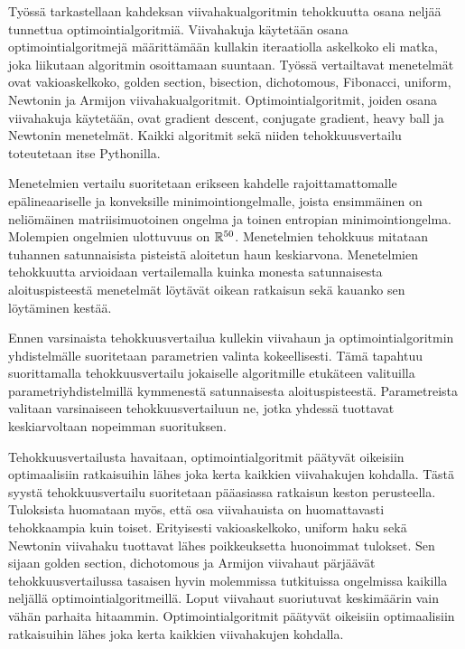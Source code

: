 \documentclass[english, 12pt, a4paper, sci, utf8, a-1b, online, table]{aaltothesis}
\newcommand{\R}{\ensuremath\mathbb{R}}
\begin{document}
\newpage

\begin{abstractpage}[finnish]
Työssä tarkastellaan kahdeksan viivahakualgoritmin tehokkuutta osana neljää tunnettua optimointialgoritmiä. Viivahakuja käytetään osana optimointialgoritmejä määrittämään kullakin iteraatiolla askelkoko eli matka, joka liikutaan algoritmin osoittamaan suuntaan. Työssä vertailtavat menetelmät ovat vakioaskelkoko, golden section, bisection, dichotomous, Fibonacci, uniform, Newtonin ja Armijon viivahakualgoritmit. Optimointialgoritmit, joiden osana viivahakuja käytetään, ovat gradient descent, conjugate gradient, heavy ball ja Newtonin menetelmät. Kaikki algoritmit sekä niiden tehokkuusvertailu toteutetaan itse Pythonilla.

Menetelmien vertailu suoritetaan erikseen kahdelle rajoittamattomalle epälineaariselle ja konveksille minimointiongelmalle, joista ensimmäinen on neliömäinen matriisimuotoinen ongelma ja toinen entropian minimointiongelma. Molempien ongelmien ulottuvuus on $\R^{50}$. Menetelmien tehokkuus mitataan tuhannen satunnaisista pisteistä aloitetun haun keskiarvona. Menetelmien tehokkuutta arvioidaan vertailemalla kuinka monesta satunnaisesta aloituspisteestä menetelmät löytävät oikean ratkaisun sekä kauanko sen löytäminen kestää.
  
Ennen varsinaista tehokkuusvertailua kullekin viivahaun ja optimointialgoritmin yhdistelmälle suoritetaan parametrien valinta kokeellisesti. Tämä tapahtuu suorittamalla tehokkuusvertailu jokaiselle algoritmille etukäteen valituilla parametriyhdistelmillä kymmenestä satunnaisesta aloituspisteestä. Parametreista valitaan varsinaiseen tehokkuusvertailuun ne, jotka yhdessä tuottavat keskiarvoltaan nopeimman suorituksen.
  
Tehokkuusvertailusta havaitaan, optimointialgoritmit päätyvät oikeisiin optimaalisiin ratkaisuihin lähes joka kerta kaikkien viivahakujen kohdalla. Tästä syystä tehokkuusvertailu suoritetaan pääasiassa ratkaisun keston perusteella. Tuloksista huomataan myös, että osa viivahauista on huomattavasti tehokkaampia kuin toiset. Erityisesti vakioaskelkoko, uniform haku sekä Newtonin viivahaku tuottavat lähes poikkeuksetta huonoimmat tulokset. Sen sijaan golden section, dichotomous ja Armijon viivahaut pärjäävät tehokkuusvertailussa tasaisen hyvin molemmissa tutkituissa ongelmissa kaikilla neljällä optimointialgoritmeillä. Loput viivahaut suoriutuvat keskimäärin vain vähän parhaita hitaammin. Optimointialgoritmit päätyvät oikeisiin optimaalisiin ratkaisuihin lähes joka kerta kaikkien viivahakujen kohdalla.
  

\end{abstractpage}
\end{document}
